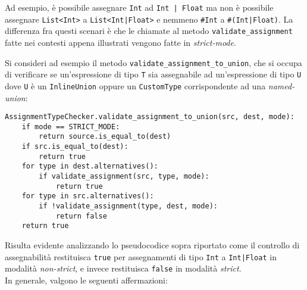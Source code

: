 Ad esempio, è possibile assegnare \texttt{Int} ad \texttt{Int | Float} ma non è 
possibile assegnare \texttt{List<Int>} a \texttt{List<Int|Float>} e nemmeno 
\texttt{\#Int} a \texttt{\#(Int|Float)}. La differenza fra questi scenari è che le chiamate al 
metodo \texttt{validate\_assignment} fatte nei contesti appena illustrati vengono fatte in \textit{strict-mode}. \\

\newpage

Si consideri ad esempio il metodo \texttt{validate\_assignment\_to\_union}, che si occupa di verificare
se un'espressione di tipo \texttt{T} sia assegnabile ad un'espressione di tipo \texttt{U} dove \texttt{U}
è un \texttt{InlineUnion} oppure un \texttt{CustomType} corrispondente ad una \textit{named-union}: \\

\vspace{0.5cm}
\begin{lstlisting}[frame=single]
AssignmentTypeChecker.validate_assignment_to_union(src, dest, mode):
    if mode == STRICT_MODE:
        return source.is_equal_to(dest)
    if src.is_equal_to(dest):
        return true
    for type in dest.alternatives():
        if validate_assignment(src, type, mode):
            return true
    for type in src.alternatives():
        if !validate_assignment(type, dest, mode):
            return false
    return true
\end{lstlisting}
\vspace{0.5cm}

Risulta evidente analizzando lo pseudocodice sopra riportato come il controllo di assegnabilità
restituisca \texttt{true} per assegnamenti di tipo \texttt{Int} a \texttt{Int|Float} in modalità \textit{non-strict}, 
e invece restituisca \texttt{false} in modalità \textit{strict}. \\

In generale, valgono le seguenti affermazioni:

